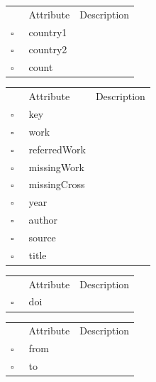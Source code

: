 \begin{table}
\caption{CountryCollab  }

\begin{longtable}{llp{8cm}}
& Attribute & Description \\
$\square$\ & country1 &  \\
$\square$\ & country2 &  \\
$\square$\ & count &  \\
\end{longtable}
\label{attr:CountryCollab}
\end{table}

\begin{table}
\caption{CrossReference  }

\begin{longtable}{llp{8cm}}
& Attribute & Description \\
$\square$\ & key &  \\
$\square$\ & work &  \\
$\square$\ & referredWork &  \\
$\square$\ & missingWork &  \\
$\square$\ & missingCross &  \\
$\square$\ & year &  \\
$\square$\ & author &  \\
$\square$\ & source &  \\
$\square$\ & title &  \\
\end{longtable}
\label{attr:CrossReference}
\end{table}

\clearpage
\begin{table}
\caption{DoiReference  }

\begin{longtable}{llp{8cm}}
& Attribute & Description \\
$\square$\ & doi &  \\
\end{longtable}
\label{attr:DoiReference}
\end{table}

\begin{table}
\caption{Edge  }

\begin{longtable}{llp{8cm}}
& Attribute & Description \\
$\square$\ & from &  \\
$\square$\ & to &  \\
\end{longtable}
\label{attr:Edge}
\end{table}

